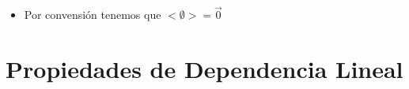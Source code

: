 \documentclass[12pt, fleqn]{report}                             %
\newenvironment{SmallIndentation}[1][0.75em]                    %
        {\begin{adjustwidth}{#1}{}\begin{footnotesize}}             %
        {\end{footnotesize}\end{adjustwidth}}                       %
\DeclareMathOperator \Space {\quad}                             %
\theoremstyle{break}                                            %
\begin{document}
\begin{itemize}
\begin{SmallIndentation}[1em]
\begin{itemize}
                                \item
                                    Tenemos que:
                                    \begin{equation*}
                                        k \vec a 
                                            = k \sum_{i = 1}^n r_i \vec v_i
                                            = \sum_{i = 1}^n (kr_i) \vec v_i  \in <S>
                                            \Space \text{ entonces } \vec ka \in <S>
                                    \end{equation*}

                                Por lo tanto todo $<S>$ es un subespacio vectorial.

                            \end{itemize}
                        
                        \end{SmallIndentation}

                    \item
                        Por convensión tenemos que $<\emptyset> = \vec 0$

                \end{itemize}



        \clearpage
        \section{Propiedades de Dependencia Lineal}
\end{document}
